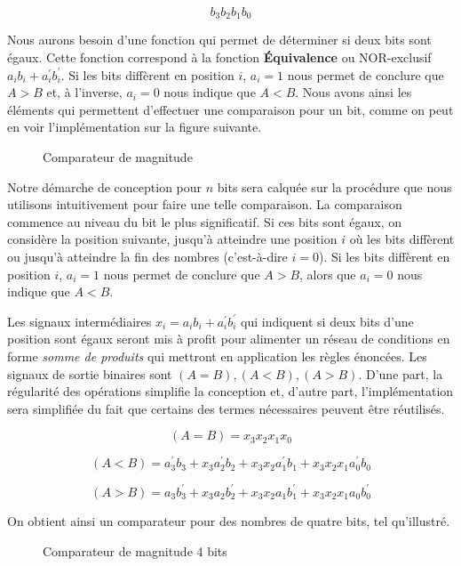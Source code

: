 \documentclass[11pt]{article}
\begin{document}
$$ b_3 b_2 b_1 b_0 $$

Nous aurons besoin d'une fonction qui permet de déterminer si deux
bits sont égaux. Cette fonction correspond à la fonction \textbf{Équivalence}
ou NOR-exclusif \(a_i b_i + a_i^\prime b_i^\prime\).  Si les bits
diffèrent en position \(i\), \(a_i = 1\) nous permet de conclure que
\(A > B\) et, à l'inverse, \(a_i = 0\) nous indique que \(A < B\). Nous avons ainsi
les éléments qui permettent d'effectuer une comparaison pour un bit,
comme on peut en voir l'implémentation sur la figure suivante.

\begin{figure}[htbp]
\centering

\caption{\label{fig:orgcf9b2c7}Comparateur de magnitude}
\end{figure}

Notre démarche de conception pour \(n\) bits sera calquée sur la
procédure que nous utilisons intuitivement pour faire une telle
comparaison. La comparaison commence au niveau du bit le plus
significatif. Si ces bits sont égaux, on considère la position
suivante, jusqu'à atteindre une position \(i\) où les bits diffèrent
ou jusqu'à atteindre la fin des nombres (c'est-à-dire \(i=0\)). Si les
bits diffèrent en position \(i\), \(a_i = 1\) nous permet de conclure
que \(A > B\), alors que \(a_i = 0\) nous indique que \(A < B\).

Les signaux intermédiaires \(x_i = a_i b_i + a_i^\prime b_i^\prime\)
qui indiquent si deux bits d'une position sont égaux seront mis à
profit pour alimenter un réseau de conditions en forme \emph{somme de
produits} qui mettront en application les règles énoncées. Les signaux
de sortie binaires sont \((A = B), (A < B), (A > B)\).  D'une part,
la régularité des opérations simplifie la conception et, d'autre part,
l'implémentation sera simplifiée du fait que certains des termes
nécessaires peuvent être réutilisés.

$$ (A = B) = x_3 x_2 x_1 x_0 $$ 

$$ (A < B) = a_3^\prime b_3 + x_3  a_2^\prime b_2  +  x_3 x_2  a_1^\prime b_1 +  x_3 x_2 x_1  a_0^\prime b_0 $$

$$ (A > B) = a_3 b_3^\prime + x_3  a_2 b_2^\prime  +  x_3 x_2  a_1 b_1^\prime +  x_3 x_2 x_1  a_0 b_0^\prime $$

On obtient ainsi un comparateur pour des nombres de quatre bits, tel qu'illustré.

\begin{figure}[htbp]
\centering

\caption{\label{fig:org65a5c7b}Comparateur de magnitude 4 bits}
\end{figure}
\end{document}
